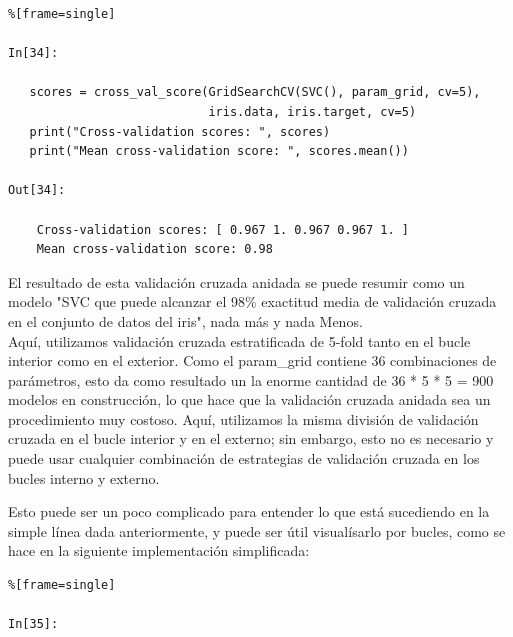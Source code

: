 {\begin{lstlisting}%[frame=single]

In[34]:
   
   scores = cross_val_score(GridSearchCV(SVC(), param_grid, cv=5),
                            iris.data, iris.target, cv=5)
   print("Cross-validation scores: ", scores)
   print("Mean cross-validation score: ", scores.mean())

Out[34]:

    Cross-validation scores: [ 0.967 1. 0.967 0.967 1. ]
    Mean cross-validation score: 0.98

\end{lstlisting}


El resultado de esta validación cruzada anidada se puede resumir como un modelo "{}SVC 
que puede alcanzar el 98\%  exactitud media de validación cruzada en el conjunto de
datos del iris{}"{},  nada más y nada Menos.\\

Aquí, utilizamos validación cruzada estratificada de 5-fold  tanto en el bucle interior como en el exterior. Como el {\ttfamily param\_grid} contiene 36 combinaciones de parámetros,   esto da como resultado un la enorme cantidad de  36 * 5 * 5 =  900  modelos en construcción,  lo que hace que la validación cruzada anidada sea un procedimiento muy costoso.    Aquí, utilizamos la  misma división  de validación cruzada en el bucle interior y en el externo; sin embargo, esto no es necesario y puede usar cualquier combinación
de estrategias de validación cruzada en los bucles interno y externo.

Esto puede ser un poco complicado para entender lo que está sucediendo en la simple línea  dada anteriormente, y puede ser útil visualísarlo  por bucles, como se hace en la siguiente implementación simplificada:


\begin{lstlisting}%[frame=single]

In[35]:


\end{lstlisting}}
